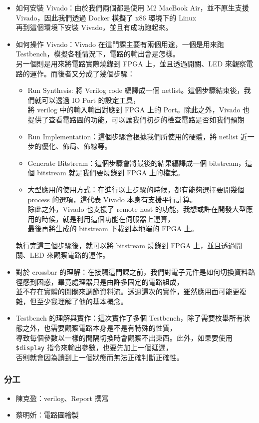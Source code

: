 \documentclass[10.5pt,compsoc,UTF8]{CjC}
\theoremstyle{mystyle}
\begin{document}
\begin{itemize}
    \item 如何安裝 Vivado：由於我們兩個都是使用 M2 MacBook Air，並不原生支援 Vivado，因此我們透過 Docker 模擬了 x86 環境下的 Linux\\
    再到這個環境下安裝 Vivado，並且有成功跑起來。
    \item 如何操作 Vivado：Vivado 在這門課主要有兩個用途，一個是用來跑 Testbench，模擬各種情況下，電路的輸出會是怎樣。\\
    另一個則是用來將電路實際燒錄到 FPGA 上，並且透過開關、LED 來觀察電路的運作。而後者又分成了幾個步驟：
    \begin{itemize}
        \item Run Synthesis: 將 Verilog code 編譯成一個 netlist。這個步驟結束後，我們就可以透過 IO Port 的設定工具，\\
        將 verilog 中的輸入輸出對應到 FPGA 上的 Port。除此之外，Vivado 也提供了查看電路圖的功能，可以讓我們初步的檢查電路是否如我們預期
        \item Run Implementation：這個步驟會根據我們所使用的硬體，將 netlist 近一步的優化、佈局、佈線等。
        \item Generate Bitstream：這個步驟會將最後的結果編譯成一個 bitstream，這個 bitstream 就是我們要燒錄到 FPGA 上的檔案。\\
        \item 大型應用的使用方式：在進行以上步驟的時候，都有能夠選擇要開幾個 process 的選項，這代表 Vivado 本身有支援平行計算。\\
        除此之外，Vivado 也支援了 remote host 的功能，我想或許在開發大型應用的時候，就是利用這個功能在伺服器上運算，\\
        最後再將生成的 bitstream 下載到本地端的 FPGA 上。
    \end{itemize}
    執行完這三個步驟後，就可以將 bitstream 燒錄到 FPGA 上，並且透過開關、LED 來觀察電路的運作。
    \item 對於 crossbar 的理解：在接觸這門課之前，我們對電子元件是如何切換資料路徑感到困惑，畢竟處理器只是由許多固定的電路組成，\\
    並不存在實體的開關來調節資料流。透過這次的實作，雖然應用面可能更複雜，但至少我理解了他的基本概念。
    \item Testbench 的理解與實作：這次實作了多個 Testbench，除了需要枚舉所有狀態之外，也需要觀察電路本身是不是有特殊的性質，\\
    導致每個參數以一樣的間隔切換時會觀察不出東西。此外，如果要使用 \texttt{\$display} 指令來輸出參數，也要先加上一個延遲，\\
    否則就會因為讀到上一個狀態而無法正確判斷正確性。
\end{itemize}

\subsubsection*{分工}

\begin{itemize}
    \item 陳克盈：verilog、Report 撰寫
    \item 蔡明妡：電路圖繪製
\end{itemize}
\end{document}
